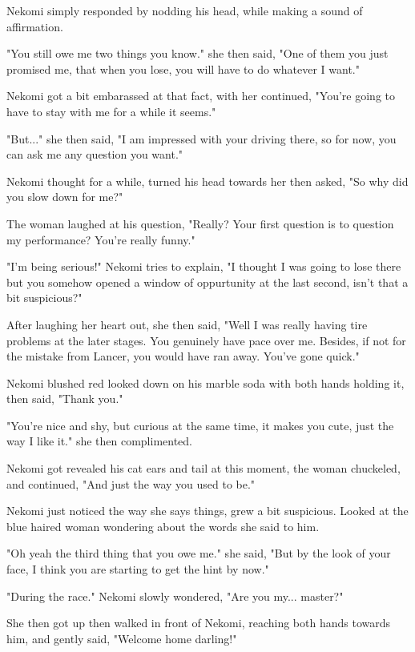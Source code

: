 Nekomi simply responded by nodding his head, while making a sound of affirmation.

"You still owe me two things you know." she then said, "One of them you just promised me, that when you lose, you will have to do whatever I want."

Nekomi got a bit embarassed at that fact, with her continued, "You're going to have to stay with me for a while it seems."

"But..." she then said, "I am impressed with your driving there, so for now, you can ask me any question you want."

Nekomi thought for a while, turned his head towards her then asked, "So why did you slow down for me?"

The woman laughed at his question, "Really? Your first question is to question my performance? You're really funny."

"I'm being serious!" Nekomi tries to explain, "I thought I was going to lose there but you somehow opened a window of oppurtunity at the last second, isn't that a bit suspicious?"

After laughing her heart out, she then said, "Well I was really having tire problems at the later stages. You genuinely have pace over me. Besides, if not for the mistake from Lancer, you would have ran away. You've gone quick."

Nekomi blushed red looked down on his marble soda with both hands holding it, then said, "Thank you."

"You're nice and shy, but curious at the same time, it makes you cute, just the way I like it." she then complimented.

Nekomi got revealed his cat ears and tail at this moment, the woman chuckeled, and continued, "And just the way you used to be."

Nekomi just noticed the way she says things, grew a bit suspicious. Looked at the blue haired woman wondering about the words she said to him.

"Oh yeah the third thing that you owe me." she said, "But by the look of your face, I think you are starting to get the hint by now."

"During the race." Nekomi slowly wondered, "Are you my... master?"

She then got up then walked in front of Nekomi, reaching both hands towards him, and gently said, "Welcome home darling!"

